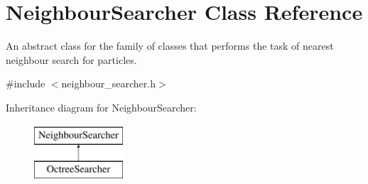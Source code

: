 \hypertarget{classNeighbourSearcher}{\section{Neighbour\-Searcher Class Reference}
\label{classNeighbourSearcher}
}


An abstract class for the family of classes that performs the task of nearest neighbour search for particles.  




{\ttfamily \#include $<$neighbour\-\_\-searcher.\-h$>$}

Inheritance diagram for Neighbour\-Searcher\-:\begin{figure}[H]
\begin{center}
\leavevmode
\includegraphics[height=2.000000cm]{classNeighbourSearcher}
\end{center}
\end{figure}
